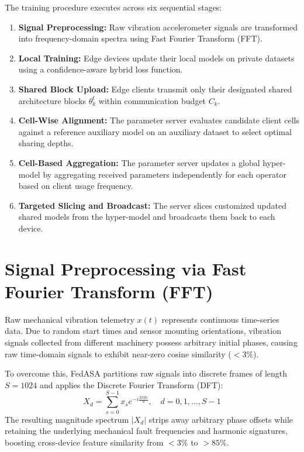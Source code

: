 \documentclass[12pt,a4paper]{report}
\begin{document}
The training procedure executes across six sequential stages:
\begin{enumerate}
    \item \textbf{Signal Preprocessing:} Raw vibration accelerometer signals are transformed into frequency-domain spectra using Fast Fourier Transform (FFT).
    \item \textbf{Local Training:} Edge devices update their local models on private datasets using a confidence-aware hybrid loss function.
    \item \textbf{Shared Block Upload:} Edge clients transmit only their designated shared architecture blocks $\theta_k^t$ within communication budget $C_k$.
    \item \textbf{Cell-Wise Alignment:} The parameter server evaluates candidate client cells against a reference auxiliary model on an auxiliary dataset to select optimal sharing depths.
    \item \textbf{Cell-Based Aggregation:} The parameter server updates a global hyper-model by aggregating received parameters independently for each operator based on client usage frequency.
    \item \textbf{Targeted Slicing and Broadcast:} The server slices customized updated shared models from the hyper-model and broadcasts them back to each device.
\end{enumerate}

\section{Signal Preprocessing via Fast Fourier Transform (FFT)}
Raw mechanical vibration telemetry $x(t)$ represents continuous time-series data. Due to random start times and sensor mounting orientations, vibration signals collected from different machinery possess arbitrary initial phases, causing raw time-domain signals to exhibit near-zero cosine similarity ($<3\%$).

To overcome this, FedASA partitions raw signals into discrete frames of length $S = 1024$ and applies the Discrete Fourier Transform (DFT):
\begin{equation}
    X_d = \sum_{s=0}^{S-1} x_s e^{-i \frac{2\pi d s}{S}}, \quad d = 0, 1, \dots, S-1
\end{equation}
The resulting magnitude spectrum $|X_d|$ strips away arbitrary phase offsets while retaining the underlying mechanical fault frequencies and harmonic signatures, boosting cross-device feature similarity from $<3\%$ to $>85\%$.
\end{document}
